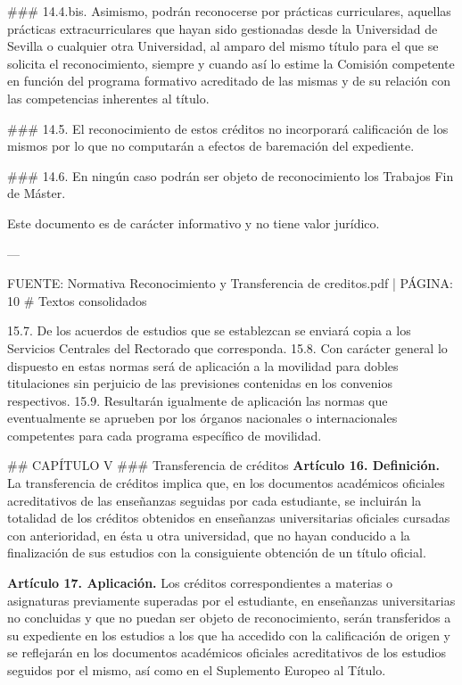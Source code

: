 \documentclass{article}
\begin{document}
\begin{itemize}
\begin{itemize}
\begin{scriptsize}
                  \#\#\# 14.4.bis.
                  Asimismo, podrán reconocerse por prácticas curriculares, aquellas prácticas extracurriculares que hayan sido gestionadas desde la Universidad de Sevilla o cualquier otra Universidad, al amparo del mismo título para el que se solicita el reconocimiento, siempre y cuando así lo estime la Comisión competente en función del programa formativo acreditado de las mismas y de su relación con las competencias inherentes al título.

                  \#\#\# 14.5.
                  El reconocimiento de estos créditos no incorporará calificación de los mismos por lo que no computarán a efectos de baremación del expediente.

                  \#\#\# 14.6.
                  En ningún caso podrán ser objeto de reconocimiento los Trabajos Fin de Máster.

                  Este documento es de carácter informativo y no tiene valor jurídico.

                  ---

                  FUENTE: Normativa Reconocimiento y Transferencia de creditos.pdf | PÁGINA: 10
                  \# Textos consolidados

                  15.7. De los acuerdos de estudios que se establezcan se enviará copia a los Servicios Centrales del Rectorado que corresponda.
                  15.8. Con carácter general lo dispuesto en estas normas será de aplicación a la movilidad para dobles titulaciones sin perjuicio de las previsiones contenidas en los convenios respectivos.
                  15.9. Resultarán igualmente de aplicación las normas que eventualmente se aprueben por los órganos nacionales o internacionales competentes para cada programa específico de movilidad.

                  \#\# CAPÍTULO V
                  \#\#\# Transferencia de créditos
                  \textbf{Artículo 16. Definición.}
                  La transferencia de créditos implica que, en los documentos académicos oficiales acreditativos de las enseñanzas seguidas por cada estudiante, se incluirán la totalidad de los créditos obtenidos en enseñanzas universitarias oficiales cursadas con anterioridad, en ésta u otra universidad, que no hayan conducido a la finalización de sus estudios con la consiguiente obtención de un título oficial.

                  \textbf{Artículo 17. Aplicación.}
                  Los créditos correspondientes a materias o asignaturas previamente superadas por el estudiante, en enseñanzas universitarias no concluidas y que no puedan ser objeto de reconocimiento, serán transferidos a su expediente en los estudios a los que ha accedido con la calificación de origen y se reflejarán en los documentos académicos oficiales acreditativos de los estudios seguidos por el mismo, así como en el Suplemento Europeo al Título.


\end{scriptsize}
\end{itemize}
\end{itemize}
\end{document}
